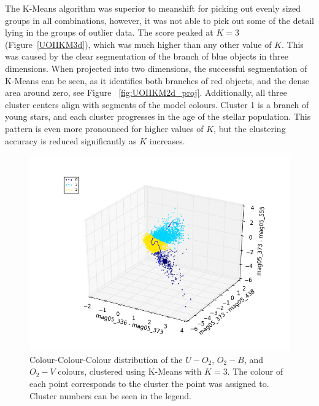 The K-Means algorithm was superior to meanshift for picking out evenly sized groups in all combinations, however, it was not able to pick out some of the detail lying in the groups of outlier data. 
The score peaked at $K=3$ (Figure~\ref{UOIIKM3d}), which was much higher than any other value of $K$.
This was caused by the clear segmentation of the branch of blue objects in three dimensions.
When projected into two dimensions, the successful segmentation of K-Means can be seen, as it identifies both branches of red objects, and the dense area around zero, see Figure ~\ref{fig:UOIIKM2d_proj}.
Additionally, all three cluster centers align with segments of the model colours.
Cluster 1 is a branch of young stars, and each cluster progresses in the age of the stellar population.
This pattern is even more pronounced for higher values of $K$, but the clustering accuracy is reduced significantly as $K$ increases.

\begin{figure}
\centering
\includegraphics[width=\linewidth]{figs/successful/kmeans_3d_3cl_mag05_336-mag05_373vsmag05_373-mag05_438vsmag05_373-mag05_555}
\caption{Colour-Colour-Colour distribution of the $U-O_{2}$, $O_{2}-B$, and $O_{2}-V$ colours, clustered using K-Means with $K=3$. The colour of each point corresponds to the cluster the point was assigned to. Cluster numbers can be seen in the legend.}
\label{fig:UOIIKM3d}
\end{figure}

